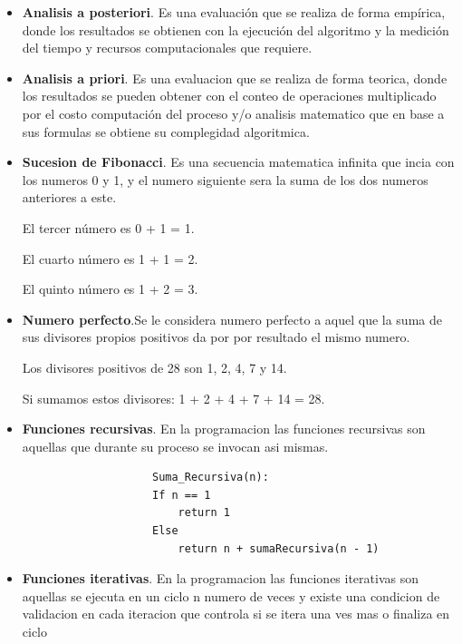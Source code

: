 \documentclass[12pt,twoside]{article}
\begin{document}
\begin{itemize}
\item \textbf{Analisis a posteriori}. Es una evaluación que se realiza de forma empírica, donde los resultados se obtienen con la ejecución del algoritmo y la medición del tiempo y recursos computacionales que requiere.

\item \textbf{Analisis a priori}. Es una evaluacion que se realiza de forma teorica, donde los resultados se pueden obtener con el conteo de operaciones multiplicado por el costo computación del proceso y/o analisis matematico que en base a sus formulas se obtiene su complegidad algoritmica.


\item \textbf{Sucesion de Fibonacci}. Es una secuencia matematica infinita que incia con los numeros 0 y 1, y el numero siguiente sera la suma de los dos numeros anteriores a este.\\

\centerline{El tercer número es 0 + 1 = 1.}
\centerline{El cuarto número es 1 + 1 = 2.}
\centerline{El quinto número es 1 + 2 = 3.}

\item \textbf{Numero perfecto}.Se le considera numero perfecto a aquel que la suma de sus divisores propios positivos da por por resultado el mismo numero.\\

\centerline{Los divisores positivos de 28 son 1, 2, 4, 7 y 14.}
\centerline{Si sumamos estos divisores: 1 + 2 + 4 + 7 + 14 = 28.}

\item \textbf{Funciones recursivas}. En la programacion las funciones recursivas son aquellas que durante su proceso se invocan asi mismas.

\begin{centering}
\begin{verbatim}
                    Suma_Recursiva(n):
                    If n == 1
                        return 1 
                    Else
                        return n + sumaRecursiva(n - 1)
\end{verbatim}
\end{centering}

\item \textbf{Funciones iterativas}. En la programacion las funciones iterativas son aquellas se ejecuta en un ciclo n numero de veces y existe una condicion de validacion en cada iteracion que controla si se itera una ves mas o finaliza en ciclo


\end{itemize}
\end{document}
